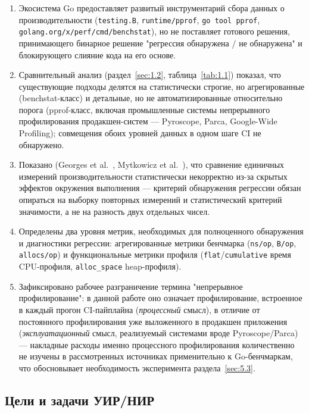 \begin{enumerate}
\item Экосистема Go предоставляет развитый инструментарий сбора данных о
производительности (\texttt{testing.B}, \texttt{runtime/\allowbreak pprof},
\texttt{go tool pprof}, \texttt{golang.org/\allowbreak x/\allowbreak perf/\allowbreak cmd/\allowbreak benchstat}), но не
поставляет готового решения, принимающего бинарное решение "регрессия
обнаружена / не обнаружена" и блокирующего слияние кода на его основе.
\item Сравнительный анализ (раздел~\ref{sec:1.2}, таблица~\ref{tab:1.1})
показал, что существующие подходы делятся на статистически строгие, но
агрегированные (benchstat-класс) и детальные, но не автоматизированные
относительно порога (pprof-класс, включая промышленные системы
непрерывного профилирования продакшен-систем — Pyroscope, Parca,
Google-Wide Profiling); совмещения обоих уровней данных в одном шаге CI не
обнаружено.
\item Показано (Georges et al.~\cite{georges2007}, Mytkowicz et
al.~\cite{mytkowicz2009}), что сравнение единичных измерений
производительности статистически некорректно из-за скрытых эффектов
окружения выполнения — критерий обнаружения регрессии обязан опираться на
выборку повторных измерений и статистический критерий значимости, а не на
разность двух отдельных чисел.
\item Определены два уровня метрик, необходимых для полноценного
обнаружения и диагностики регрессии: агрегированные метрики бенчмарка
(\texttt{ns/\allowbreak op}, \texttt{B/\allowbreak op}, \texttt{allocs/\allowbreak op}) и функциональные метрики
профиля (\texttt{flat}/\texttt{cumulative} время CPU-профиля,
\texttt{alloc\_space} heap-профиля).
\item Зафиксировано рабочее разграничение термина "непрерывное
профилирование": в данной работе оно означает профилирование, встроенное в
каждый прогон CI-пайплайна (\emph{процессный} смысл), в отличие от
постоянного профилирования уже выложенного в продакшен приложения
(\emph{эксплуатационный} смысл, реализуемый системами вроде Pyroscope/Parca)
— накладные расходы именно процессного профилирования количественно не
изучены в рассмотренных источниках применительно к Go-бенчмаркам, что
обосновывает необходимость эксперимента раздела~\ref{sec:5.3}.
\end{enumerate}

\subsection{Цели и задачи УИР/НИР}

